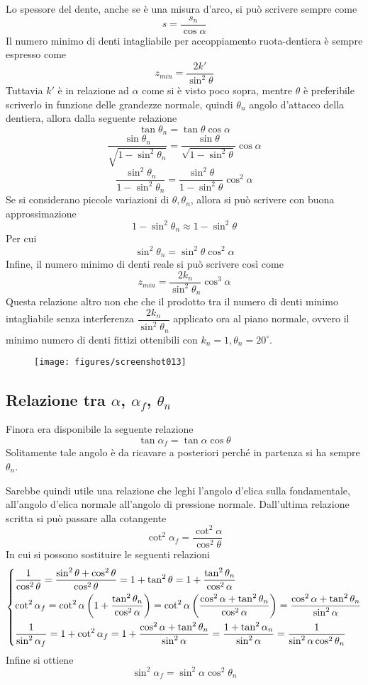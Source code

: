 \documentclass[a4paper, 15pt]{article}
\begin{document}
\begin{adjustwidth}{2in}{}
Lo spessore del dente, anche se è una misura d'arco, si può scrivere sempre come 
\[s = \dfrac{s_n}{\cos\alpha}\]
Il numero minimo di denti intagliabile per accoppiamento ruota-dentiera è sempre espresso come 
\[z_{min} = \dfrac{2k'}{\sin^2\theta}\]
Tuttavia $k'$ è in relazione ad $\alpha$ come si è visto poco sopra, mentre $\theta$ è preferibile scriverlo in funzione delle grandezze normale, quindi $\theta_n$ angolo d'attacco della dentiera, allora dalla seguente relazione
\[\tan\theta_n = \tan\theta\cos\alpha\]
\[\dfrac{\sin\theta_n}{\sqrt{1-\sin^2\theta_n}} = \dfrac{\sin\theta}{\sqrt{1-\sin^2\theta}}\cos\alpha\]
\[\dfrac{\sin^2\theta_n}{1-\sin^2\theta_n} = \dfrac{\sin^2\theta}{1-\sin^2\theta}\cos^2\alpha\]
Se si considerano piccole variazioni di $\theta, \theta_n$, allora si può scrivere con buona approssimazione 
\[1-\sin^2\theta_n \approx 1-\sin^2\theta\] 
Per cui
\[\sin^2\theta_n = \sin^2\theta\cos^2\alpha\]
Infine, il numero minimo di denti reale si può scrivere così come 
\[z_{min} = \dfrac{2k_n}{\sin^2\theta_n}\cos^3\alpha\]
Questa relazione altro non che che il prodotto tra il numero di denti minimo intagliabile senza interferenza $\dfrac{2k_n}{\sin^2\theta_n}$ applicato ora al piano normale, ovvero il minimo numero di denti fittizi ottenibili con $k_n = 1, \theta_n = 20^\circ$.
\begin{figure}[H]
	\centering
	\texttt{[image: figures/screenshot013]}
	\label{fig:screenshot013}
\end{figure}
\end{adjustwidth}

\subsection{Relazione tra $\alpha$, $\alpha_f$, $\theta_n$}
\begin{adjustwidth}{2in}{}	
	Finora era disponibile la seguente relazione 
	\[\tan\alpha_f = \tan\alpha\cos\theta\]
	Solitamente tale angolo è da ricavare a posteriori perché in partenza si ha sempre $\theta_n$.
	
	Sarebbe quindi utile una relazione che leghi l'angolo d'elica sulla fondamentale, all'angolo d'elica normale all'angolo di pressione normale. 
	Dall'ultima relazione scritta si può passare alla cotangente
	\[\cot^2\alpha_f = \dfrac{\cot^2\alpha}{\cos^2\theta}\]
	In cui si possono sostituire le seguenti relazioni
	\[\begin{dcases}
		\dfrac{1}{\cos^2\theta} = \dfrac{\sin^2\theta+\cos^2\theta}{\cos^2\theta} = 1+\tan^2\theta = 1 + \dfrac{\tan^2\theta_n}{\cos^2\alpha}\\
	\cot^2\alpha_f = \cot^2\alpha\left(1+\dfrac{\tan^2\theta_n}{\cos^2\alpha}\right) = \cot^2\alpha\left(\dfrac{\cos^2\alpha+\tan^2\theta_n}{\cos^2\alpha}\right) = \dfrac{\cos^2\alpha + \tan^2\theta_n}{\sin^2\alpha}\\
	\dfrac{1}{\sin^2\alpha_f} = 1 + \cot^2\alpha_f = 1 + \dfrac{\cos^2\alpha+\tan^2\theta_n}{\sin^2\alpha} = \dfrac{1+\tan^2\alpha_n}{\sin^2\alpha} = \dfrac{1}{\sin^2\alpha\cos^2\theta_n}
	\end{dcases}\]
	Infine si ottiene 
	\[\sin^2\alpha_f = \sin^2\alpha\cos^2\theta_n\]
\end{adjustwidth}
\newpage
\end{document}
